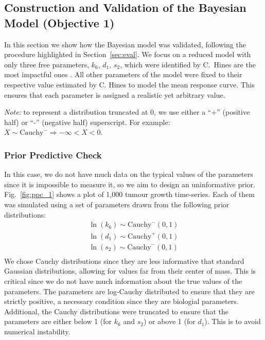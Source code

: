 \documentclass[11pt]{article}
\begin{document}
\subsection{Construction and Validation of the Bayesian Model (Objective 1)}
In this section we show how the Bayesian model was validated, following the procedure highlighted in Section~\ref{sec:eval}. We focus on a reduced model with only three free parameters, $k_6$, $d_1$, $s_2$, which were identified by C.~Hines are the most impactful ones \cite{christian1}. All other parameters of the model were fixed to their respective value estimated by C. Hines to model the mean response curve. This ensures that each parameter is assigned a realistic yet arbitrary value.

\textit{Note:} to represent a distribution truncated at 0, we use either a ``+'' (positive half) or ``-'' (negative half) superscript. For example: $X \sim  \text{Cauchy}^- \Rightarrow - \infty < X < 0$.

\subsubsection{Prior Predictive Check}
In this case, we do not have much data on the typical values of the parameters since it is impossible to measure it, so we aim to design an uninformative prior. Fig.~\ref{fig:ppc_1} shows a plot of 1,000 tumour growth time-series. Each of them was simulated using a set of parameters drawn from the following prior distributions:
\begin{align*}
    \ln(k_6) \sim \text{Cauchy}^-(0, 1) \\ 
    \ln(d_1) \sim \text{Cauchy}^+(0, 1) \\ 
    \ln(s_2) \sim \text{Cauchy}^-(0, 1) \\ 
\end{align*} 
We chose Cauchy distributions since they are less informative that standard Gaussian distributions, allowing for values far from their center of mass. This is critical since we do not have much information about the true values of the parameters. The parameters are log-Cauchy distributed to ensure that they are strictly positive, a necessary condition since they are biologial parameters. Additional, the Cauchy distributions were truncated to ensure that the parameters are either below 1 (for $k_6$ and $s_2$) or above 1 (for $d_1$). This is to avoid numerical instability.
\end{document}
